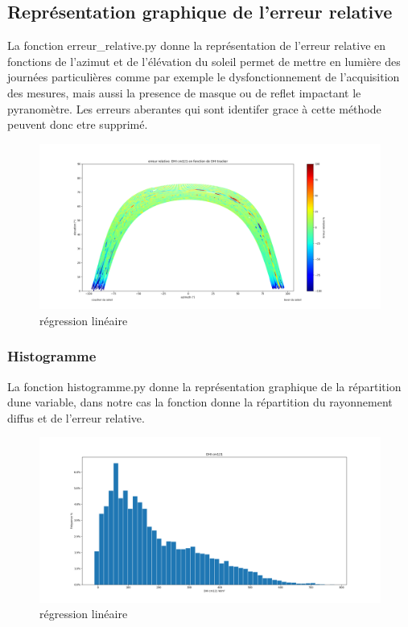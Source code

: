 \documentclass[12pt,a4paper]{article}
\begin{document}
\begin{flushleft}
\subsection{Représentation graphique de l'erreur relative}

La fonction erreur\_relative.py donne la représentation de l'erreur relative en fonctions de l'azimut et de l'élévation du soleil permet de mettre en lumière des journées particulières comme par exemple le dysfonctionnement de l'acquisition des mesures, mais aussi la presence de masque ou de reflet impactant le pyranomètre. Les erreurs aberantes qui sont identifer grace à cette méthode peuvent donc etre supprimé.\\
 
\begin{figure}[H]
\centering
\includegraphics[width=15cm]{image/erreur_relative/1.png} 
\caption{régression linéaire}  
\end{figure}

\subsubsection{Histogramme}

La fonction histogramme.py donne la représentation graphique de la répartition dune variable, dans notre cas la fonction donne la répartition du rayonnement diffus et de l'erreur relative.\\

\begin{figure}[H]
\centering
\includegraphics[width=15cm]{image/histogramme/1.png} 
\caption{régression linéaire}  
\end{figure}


\end{flushleft}
\end{document}

